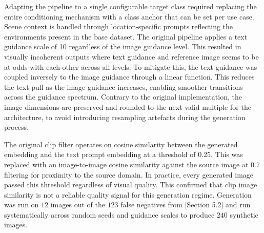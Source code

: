 Adapting the pipeline to a single configurable target class required replacing the entire conditioning mechanism with a class anchor that can be set per use case. 
Scene context is handled through location-specific prompts reflecting the environments present in the base dataset. 
The original pipeline applies a text guidance scale of 10 regardless of the image guidance level. This resulted in visually incoherent
outputs where text guidance and reference image seems to be at odds with each other across all levels. To mitigate this, the text guidance was coupled inversely to the image guidance through
a linear function. This reduces the text-pull as the image guidance increases, enabling smoother transitions across the guidance spectrum. 
Contrary to the original implementation, the image dimensions are preserved and rounded to the next valid multiple for the architecture, to avoid introducing resampling artefacts during the generation process. 

The original \gls{clip} filter operates on \gls{cosine similarity} between the generated embedding and the text prompt embedding at a threshold of $0.25$. This was replaced with
an image-to-image \gls{cosine similarity} against the source image at $0.7$ filtering for proximity to the source domain. 
In practice, every generated image passed this threshold regardless of visual quality. This confirmed that \gls{clip} image similarity is not a reliable quality signal for this generation regime. 
Generation was run on $12$ images out of the $123$ false negatives from [Section 5.2] and run systematically across random seeds and guidance scales to produce $240$ synthetic images. 

